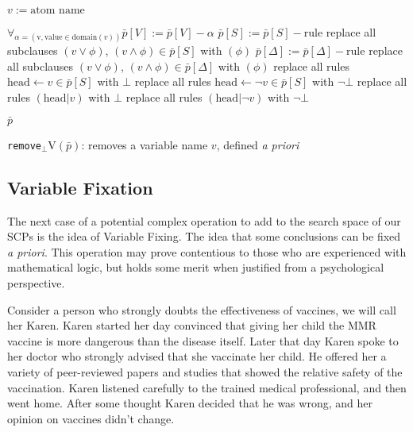 \begin{algorithm}[H] \label{cogOp:removeuV}
\SetAlgoLined
{}
$v:= \text{atom name}$\;
{
$\forall_{\alpha = (\text{v},\text{value}\in \text{domain}(v))} \bar{p}[V]:=\bar{p}[V] - \alpha$\;
{
{
$\bar{p}[S]:=\bar{p}[S]-\text{rule}$\;
}
{
replace all subclauses $(v \lor \phi)$, $(v \land \phi)\in \bar{p}[S]$ with $(\phi)$\;
}
}
{
{
$\bar{p}[\Delta]:=\bar{p}[\Delta] - \text{rule}$\;
}
{
replace all subclauses $(v \lor \phi)$, $(v \land \phi)\in \bar{p}[\Delta]$ with $(\phi)$\;
}
}
replace all rules $\text{head} \leftarrow v \in \bar{p}[S]$ with $\bot$\;
replace all rules $\text{head} \leftarrow \lnot v \in \bar{p}[S]$ with $\lnot \bot$\;
replace all rules $(\text{head}|v)$ with $\bot$\;
replace all rules $(\text{head}|\lnot v)$ with $\lnot \bot$\;

\Return $\bar{p}$
}

\caption{\texttt{remove}$_\bot$V$(\bar{p})$: removes a variable name $v$, defined \textit{a priori}}
\end{algorithm}
\subsection{Variable Fixation} \label{ssec:variableFixing}
The next case of a potential complex operation to add to the search space of our SCPs is the idea of Variable Fixing. The idea that some  conclusions can be fixed \textit{a priori}. This operation may prove contentious to those who are experienced with mathematical logic, but holds some merit when justified from a psychological perspective. 

Consider a person who strongly doubts the effectiveness of vaccines, we will call her Karen. Karen started her day convinced that giving her child the MMR vaccine is more dangerous than the disease itself. Later that day Karen spoke to her doctor who strongly advised that she vaccinate her child. He offered her a variety of peer-reviewed papers and studies that showed the relative safety of the vaccination. Karen listened carefully to the trained medical professional, and then went home. After some thought Karen decided that he was wrong, and her opinion on vaccines didn't change.

